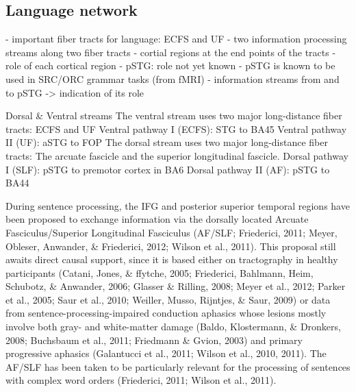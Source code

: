 \subsection{Language network}
- important fiber tracts for language: ECFS and UF
- two information processing streams along two fiber tracts
- cortial regions at the end points of the tracts
- role of each cortical region
- pSTG: role not yet known
- pSTG is known to be used in SRC/ORC grammar tasks (from fMRI)
- information streams from and to pSTG -> indication of its role

Dorsal \& Ventral streams
The ventral stream uses two major long-distance fiber tracts: ECFS and UF
Ventral pathway I (ECFS): STG to BA45
Ventral pathway II (UF): aSTG to FOP
The dorsal stream uses two major long-distance fiber tracts: The arcuate fascicle and the superior longitudinal fascicle.
Dorsal pathway I (SLF): pSTG to premotor cortex in BA6
Dorsal pathway II (AF): pSTG to BA44

During sentence processing, the IFG and posterior superior temporal regions have been proposed to exchange information via
 the dorsally located Arcuate Fasciculus/Superior Longitudinal Fasciculus (AF/SLF; Friederici, 2011; Meyer, Obleser, Anwander, \& Friederici, 2012; Wilson et al., 2011). This proposal still awaits direct causal support, since it is based either on tractography in healthy participants (Catani, Jones, \& ffytche, 2005; Friederici, Bahlmann, Heim, Schubotz, \& Anwander, 2006; Glasser \& Rilling, 2008; Meyer et al., 2012; Parker et al., 2005; Saur et al., 2010; Weiller, Musso, Rijntjes, \& Saur, 2009) or data from sentence-processing-impaired conduction aphasics whose lesions mostly involve both gray- and white-matter damage (Baldo, Klostermann, \& Dronkers, 2008; Buchsbaum et al., 2011; Friedmann \& Gvion, 2003) and primary progressive aphasics (Galantucci et al., 2011; Wilson et al., 2010, 2011). The AF/SLF has been taken to be particularly relevant for the
 processing of sentences with complex word orders (Friederici,
 2011; Wilson et al., 2011).

